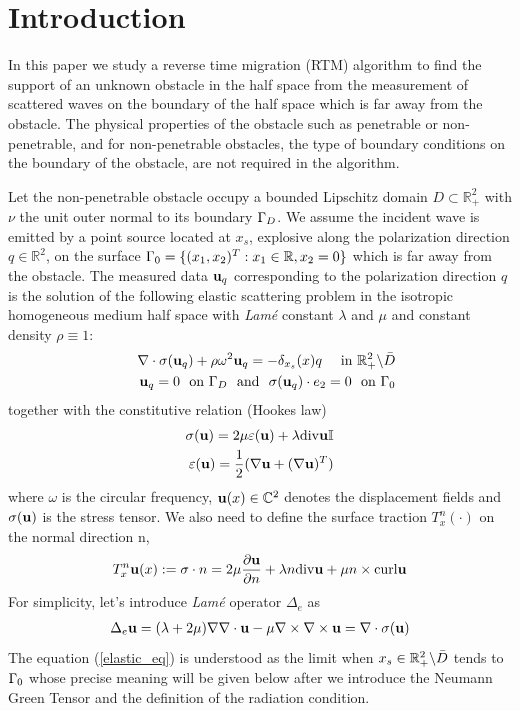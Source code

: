 \documentclass[12pt]{iopart}
\begin{document}
\newcommand{\N}{\mathbb{N}}
\newcommand{\D}{\mathbb{D}}
\newcommand{\G}{\mathbb{G}}
\newcommand{\F}{\mathbb{F}}
\newcommand{\R}{\mathbb{R}}
\newcommand{\W}{\mathbb{W}}
\newcommand{\J}{\mathbb{J}}
\newcommand{\Zg}{\mathbb{Z}}
\newcommand{\Gtheta}{\mathbb{\Theta}}
\newcommand{\Gphi}{\mathbb{\Phi}}

\newcommand{\be}{\begin{eqnarray}}
\newcommand{\ee}{\end{eqnarray}}
\newcommand{\ben}{\begin{eqnarray*}}
\newcommand{\een}{\end{eqnarray*}}
\newcommand{\nn}{\nonumber}

\section{Introduction}\label{section1}
In this paper we study a reverse time migration (RTM) algorithm to find the support of an unknown obstacle in the half space from the measurement of scattered waves on the boundary of the half space which is far away from the obstacle. The physical properties of the obstacle such as penetrable or non-penetrable, and for non-penetrable obstacles, the type of boundary conditions on the boundary of the obstacle, are not required in the algorithm.

Let the non-penetrable obstacle occupy a bounded Lipschitz domain $D\subset\R_+^2$ with $\nu$ the unit outer normal to its boundary $\Gamma_D$. We
assume the incident wave is emitted by a point source located at $x_s$, explosive along the polarization direction $q\in\R^2$, on the surface $\Ga_0=\{(x_1,x_2)^T:x_1\in\R,x_2=0\}$ which is far away from the obstacle. The measured data $\mathbf{u}_q$ corresponding to the polarization direction $q$ is the solution of the following elastic scattering problem in the isotropic homogeneous medium half space with \emph{Lam\'{e}} constant $\lambda$ and $\mu$ and constant density $\rho\equiv1$:
\be\label{elastic_eq}
& &\nabla\cdot\sigma(\u_q) + \rho\omega^2\u_q= -\delta_{x_s}(x)q \ \ \ \ \mbox{in }\R_+^2\bks \bar{D}\\
& &\u_q=0 \ \ \mbox{on} \ \Ga_D  \ \ \mbox{and} \ \ \sigma(\u_q)\cdot e_2=0 \ \ \mbox{on} \ \Ga_0
\ee
together with the constitutive relation (Hookes law)
\ben
\sigma(\u) = 2\mu\ep(\u) + \lambda\div \u \I \\
\ep(\u)=\frac{1}{2}(\na \u +(\na \u)^T)
\een
where $\omega$ is the circular frequency, $\mathbf{u}(x)\in{\mathbb{C}}^2$ denotes the displacement fields and $\sigma(\mathbf{u})$ is the stress tensor. We also need to define the surface traction $T_x^n (\cdot)$ on the normal direction n,
\ben
T_x^n \u(x) := \sigma\cdot n = 2\mu\frac{\pa \u}{\pa n}+\lambda n\div \u + \mu n \times \curl \u
\een
For simplicity, let's introduce \emph{Lam\'{e}} operator $\Delta_e$ as
\ben
\Delta_e \u = (\lambda+2\mu)\nabla\nabla\cdot \u - \mu\nabla\times\nabla\times \u=\nabla\cdot\sigma(\u)
\een
The equation (\ref{elastic_eq}) is understood as the limit when $x_s\in\R_+^2\bks \bar{D}$ tends to $\Gamma_0$ whose precise meaning will be given below after we introduce the Neumann Green Tensor and the definition of the radiation condition.
\end{document}
